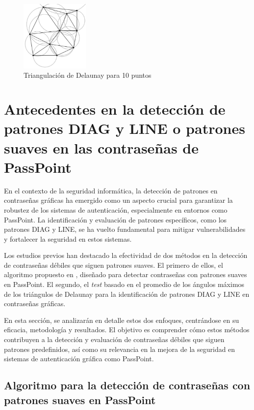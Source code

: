 \documentclass[12pt]{report}
\begin{document}
	\begin{figure}[ht]
		\centering
		\includegraphics[width=0.3\textwidth]{td_10pts.png}
		\caption{Triangulación de Delaunay para 10 puntos}
		\label{Triangulación}
	\end{figure}

\section{Antecedentes en la detección de patrones DIAG y LINE o patrones suaves en las contraseñas de PassPoint}	
	En el contexto de la seguridad informática, la detección de patrones en contraseñas gráficas ha emergido como un aspecto crucial para garantizar la robustez de los sistemas de autenticación, especialmente en entornos como PassPoint. La identificación y evaluación de patrones específicos, como los patrones DIAG y LINE, se ha vuelto fundamental para mitigar vulnerabilidades y fortalecer la seguridad en estos sistemas.
	
	Los estudios previos han destacado la efectividad de dos métodos en la detección de contraseñas débiles que siguen patrones suaves. El primero de ellos, el algoritmo propuesto en \cite{3}, diseñado para detectar contraseñas con patrones suaves en PassPoint. El segundo, el \textit{test} basado en el promedio de los ángulos máximos de los triángulos de Delaunay \cite{13} para la identificación de patrones DIAG y LINE en contraseñas gráficas.
	
	En esta sección, se analizarán en detalle estos dos enfoques, centrándose en su eficacia, metodología y resultados. El objetivo es comprender cómo estos métodos contribuyen a la detección y evaluación de contraseñas débiles que siguen patrones predefinidos, así como su relevancia en la mejora de la seguridad en sistemas de autenticación gráfica como PassPoint.

\subsection{Algoritmo para la detección de contraseñas con patrones suaves en PassPoint}
\end{document}
